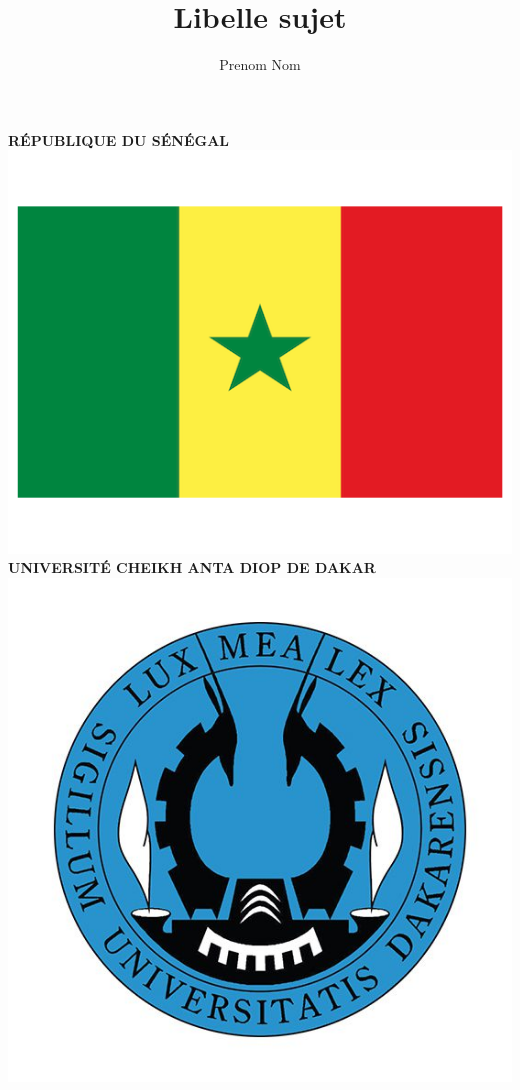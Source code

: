 \documentclass[a4paper, 12pt]{report}
\title{Libelle sujet}
\author{Prenom Nom}
\date{}
\begin{document}
	
	\begin{titlepage}
		
		\centering %
		
		
		\textsc{\normalsize \textbf{RÉPUBLIQUE DU SÉNÉGAL}}\\[0.15cm] %
		\includegraphics[scale=.1]{img/flag}\\[0.15cm]
		\textsc{\small \textbf{UNIVERSITÉ CHEIKH ANTA DIOP DE DAKAR}}\\[0.15cm]
		\includegraphics[scale=.2]{img/ucad}\\[0.15cm] %

\end{titlepage}
\end{document}
